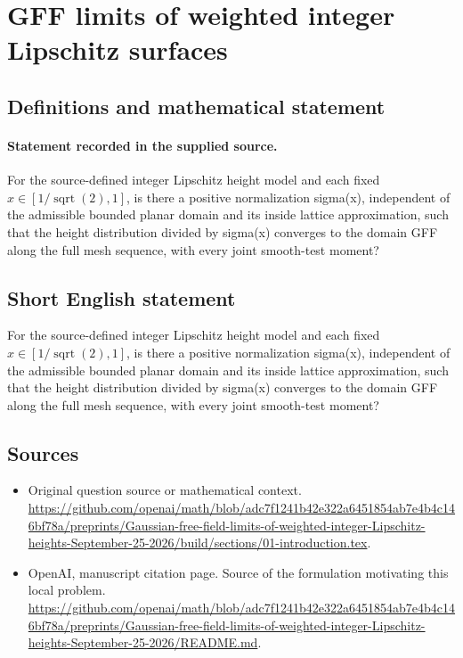 \documentclass[11pt]{article}
\begin{document}
\section*{GFF limits of weighted integer Lipschitz surfaces}\label{statement}
\subsection{Definitions and mathematical statement}
\paragraph{Statement recorded in the supplied source.}
For the source-defined integer Lipschitz height model and each fixed $x\in [1/\operatorname{sqrt}(2),1]$, is there a positive normalization sigma(x), independent of the admissible bounded planar domain and its inside lattice approximation, such that the height distribution divided by sigma(x) converges to the domain GFF along the full mesh sequence, with every joint smooth-test moment?
\subsection{Short English statement}
For the source-defined integer Lipschitz height model and each fixed $x\in [1/\operatorname{sqrt}(2),1]$, is there a positive normalization sigma(x), independent of the admissible bounded planar domain and its inside lattice approximation, such that the height distribution divided by sigma(x) converges to the domain GFF along the full mesh sequence, with every joint smooth-test moment?
\subsection{Sources}
\begin{itemize}
\item[S1] Original question source or mathematical context.
\url{https://github.com/openai/math/blob/adc7f1241b42e322a6451854ab7e4b4c146bf78a/preprints/Gaussian-free-field-limits-of-weighted-integer-Lipschitz-heights-September-25-2026/build/sections/01-introduction.tex}.
\item[S2] OpenAI, manuscript citation page. Source of the formulation motivating this local problem.
\url{https://github.com/openai/math/blob/adc7f1241b42e322a6451854ab7e4b4c146bf78a/preprints/Gaussian-free-field-limits-of-weighted-integer-Lipschitz-heights-September-25-2026/README.md}.
\end{itemize}
\end{document}
